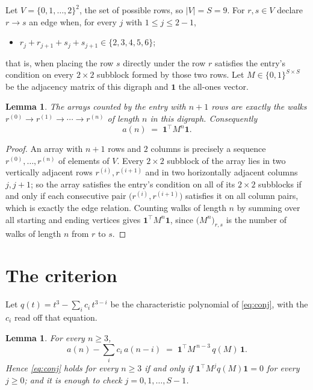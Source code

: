 \documentclass[11pt,a4paper]{article}
\theoremstyle{plain}
\newtheorem{lemma}[theorem]{Lemma}
\theoremstyle{definition}
\begin{document}
Let $V=\{0,1,\dots,2\}^{2}$, the set of possible rows, so $|V|=S=9$. For
$r,s\in V$ declare $r\to s$ an edge when, for every $j$ with $1\le j\le 2-1$,
\begin{itemize}
\item $r_j+r_{j+1}+s_j+s_{j+1}\in\{2, 3, 4, 5, 6\}$;

\end{itemize}
that is, when placing the row $s$ directly under the row $r$ satisfies the entry's
condition on every $2\times2$ subblock formed by those two rows. Let $M\in\{0,1\}^{S\times
S}$ be the adjacency matrix of this digraph and $\mathbf{1}$ the all-ones vector.

\begin{lemma}\label{lem:walk}
The arrays counted by the entry with $n+1$ rows are exactly the walks
$r^{(0)}\to r^{(1)}\to\cdots\to r^{(n)}$ of length $n$ in this digraph. Consequently
\[
a(n)\;=\;\mathbf{1}^{\!\top}M^{n}\mathbf{1} .
\]
\end{lemma}

\begin{proof}
An array with $n+1$ rows and $2$ columns is precisely a sequence
$r^{(0)},\dots,r^{(n)}$ of elements of $V$. Every $2\times2$ subblock of the array lies
in two vertically adjacent rows $r^{(i)},r^{(i+1)}$ and in two horizontally adjacent
columns $j,j+1$; so the array satisfies the entry's condition on all of its $2\times2$
subblocks if and only if each consecutive pair $\bigl(r^{(i)},r^{(i+1)}\bigr)$ satisfies
it on all column pairs, which is exactly the edge relation. Counting walks of length $n$ by
summing over all starting and ending vertices gives
$\mathbf{1}^{\!\top}M^{n}\mathbf{1}$, since
$\bigl(M^{n}\bigr)_{r,s}$ is the number of walks of length $n$ from $r$ to $s$.
\end{proof}

\section{The criterion}

Let $q(t)=t^{3}-\sum_{i}c_i\,t^{3-i}$ be the characteristic polynomial of
\eqref{eq:conj}, with the $c_i$ read off that equation.

\begin{lemma}\label{lem:crit}
For every $n\ge3$,
\[
a(n)-\sum_i c_i\,a(n-i)\;=\;\mathbf{1}^{\!\top}M^{\,n-3}\,q(M)\,\mathbf{1} .
\]
Hence \eqref{eq:conj} holds for every $n\ge3$ if and only if
$\mathbf{1}^{\!\top}M^{j}q(M)\mathbf{1}=0$ for every $j\ge0$; and it is enough to
check $j=0,1,\dots,S-1$.
\end{lemma}
\end{document}
